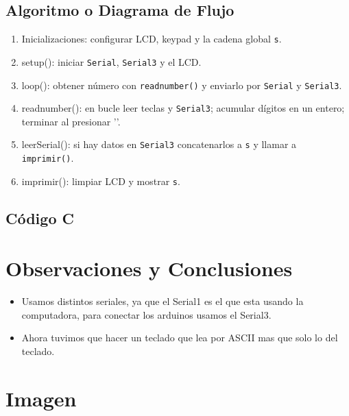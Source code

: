 \documentclass[11pt]{scrartcl}
\begin{document}
\subsection{Algoritmo o Diagrama de Flujo}

\begin{enumerate}
  \item Inicializaciones: configurar LCD, keypad y la cadena global \texttt{s}.
  \item setup(): iniciar \texttt{Serial}, \texttt{Serial3} y el LCD.
  \item loop(): obtener número con \texttt{readnumber()} y enviarlo por \texttt{Serial} y \texttt{Serial3}.
  \item readnumber(): en bucle leer teclas y \texttt{Serial3}; acumular dígitos en un entero; terminar al presionar '\*'.
  \item leerSerial(): si hay datos en \texttt{Serial3} concatenarlos a \texttt{s} y llamar a \texttt{imprimir()}.
  \item imprimir(): limpiar LCD y mostrar \texttt{s}.
\end{enumerate}

\subsection{ Código C}




\section{Observaciones y Conclusiones}

\begin{itemize}
    \item Usamos distintos seriales, ya que el Serial1 es el que esta usando la computadora, para conectar los arduinos usamos el Serial3.
    \item Ahora tuvimos que hacer un teclado que lea por ASCII mas que solo lo del teclado.
\end{itemize}
  

\section{Imagen}
\end{document}
